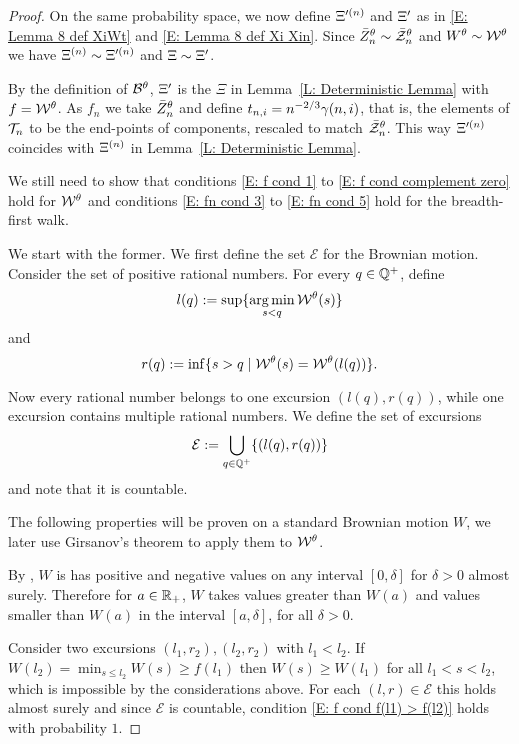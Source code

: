 \begin{proof}
	On the same probability space, we now define $\Xi^{\prime (n)}$ and $\Xi^{\prime}$ as in \eqref{E: Lemma 8 def XiWt} and \eqref{E: Lemma 8 def Xi Xin}.
	Since $\bar{Z}^{\theta}_n \sim \bar{\mathcal{Z}}^{\theta}_n$ and $W^{\theta} \sim \mathcal{W}^{\theta}$ we have $\Xi^{(n)} \sim \Xi^{\prime (n)}$ and $\Xi \sim \Xi^{\prime}$.
	
	By the definition of $\mathcal{B}^{\theta}$, 
	$\Xi^{\prime}$ is the $\Xi$ in Lemma~\ref{L: Deterministic Lemma} with $f = \mathcal{W}^{\theta}$.
	As $f_n$ we take $\bar{Z}^{\theta}_n$ and define $t_{n, i} = n^{-2 / 3} \gamma(n,i)$, that is, 
	the elements of $\mathcal{T}_n$ to be the end-points of components,
	rescaled to match $\bar{\mathcal{Z}}^{\theta}_n$.
	This way $\Xi^{\prime (n)}$ coincides with $\Xi^{(n)}$ in Lemma~\ref{L: Deterministic Lemma}.
	
	We still need to show that conditions \eqref{E: f cond 1} to \eqref{E: f cond complement zero} hold for $\mathcal{W}^{\theta}$
	and conditions \eqref{E: fn cond 3} to \eqref{E: fn cond 5} hold for the breadth-first walk.
	
	We start with the former. 
	We first define the set $\mathcal{E}$ for the Brownian motion.
	Consider the set of positive rational numbers.
	For every $q \in \mathbb{Q}^+$, 
	define 
	\begin{equation}
		l(q) := \sup\{ \operatorname*{arg\,min}_{s < q} \mathcal{W}^{\theta}(s) \}
	\end{equation}
	and
	\begin{equation}
		r(q) := \inf\{ {s > q \; | \; \mathcal{W}^{\theta}(s) = \mathcal{W}^{\theta}(l(q))} \}.
	\end{equation}
	
	Now every rational number belongs to one excursion $(l(q), r(q))$,
	while one excursion contains multiple rational numbers.
	We define the set of excursions
	\begin{equation}
	\mathcal{E} := \bigcup_{q \in \mathbb{Q}^+} \{ (l(q), r(q)) \}
	\end{equation}
	and note that it is countable.
	
	The following properties will be proven on a standard Brownian motion $W$,
	we later use Girsanov's theorem to apply them to $\mathcal{W}^{\theta}$.
	
	By \cite[Theorem 2.8, p.38]{Morters.2010},
	$W$ is has positive and negative values on any interval $[0,\delta]$ for $\delta > 0$ almost surely.
	Therefore for $a \in \mathbb{R}_+$, 
	$W$ takes values greater than $W(a)$ and values smaller than $W(a)$ in the interval $[a,\delta]$,
	for all $\delta > 0$.
	
	Consider two excursions $(l_1, r_2), (l_2, r_2)$ with $l_1 < l_2$.
	If $W(l_2) = \min_{s \leq l_2} W(s) \geq f(l_1)$ then $W(s) \geq W(l_1)$ for all $l_1 < s < l_2$,
	which is impossible by the considerations above.
	For each $(l,r) \in \mathcal{E}$ this holds almost surely
	and since $\mathcal{E}$ is countable,
	condition \eqref{E: f cond f(l1) > f(l2)} holds with probability $1$.
	

\end{proof}

